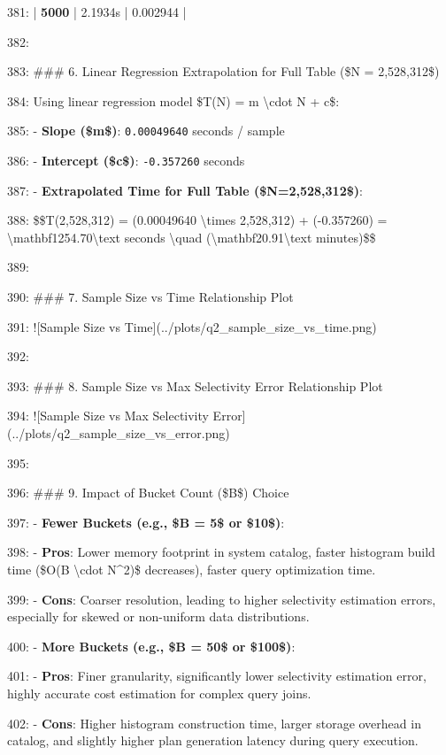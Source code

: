 \documentclass[11pt,a4paper]{article}
\begin{document}
{381: | \textbf{5000} | 2.1934s | 0.002944 |

382:

383: \#\#\# 6. Linear Regression Extrapolation for Full Table (\$N = 2,528,312\$)

384: Using linear regression model \$T(N) = m \textbackslash{}cdot N + c\$:

385: - \textbf{Slope (\$m\$)}: \texttt{0.00049640} seconds / sample

386: - \textbf{Intercept (\$c\$)}: \texttt{-0.357260} seconds

387: - \textbf{Extrapolated Time for Full Table (\$N=2,528,312\$)}:

388:   \$\$T(2,528,312) = (0.00049640 \textbackslash{}times 2,528,312) + (-0.357260) = \textbackslash{}mathbf{1254.70\textbackslash{}text{ seconds}} \textbackslash{}quad (\textbackslash{}mathbf{20.91\textbackslash{}text{ minutes}})\$\$

389:

390: \#\#\# 7. Sample Size vs Time Relationship Plot

391: ![Sample Size vs Time](../plots/q2\_sample\_size\_vs\_time.png)

392:

393: \#\#\# 8. Sample Size vs Max Selectivity Error Relationship Plot

394: ![Sample Size vs Max Selectivity Error](../plots/q2\_sample\_size\_vs\_error.png)

395:

396: \#\#\# 9. Impact of Bucket Count (\$B\$) Choice

397: - \textbf{Fewer Buckets (e.g., \$B = 5\$ or \$10\$)}:

398:   - \textbf{Pros}: Lower memory footprint in system catalog, faster histogram build time (\$O(B \textbackslash{}cdot N\textasciicircum{}2)\$ decreases), faster query optimization time.

399:   - \textbf{Cons}: Coarser resolution, leading to higher selectivity estimation errors, especially for skewed or non-uniform data distributions.

400: - \textbf{More Buckets (e.g., \$B = 50\$ or \$100\$)}:

401:   - \textbf{Pros}: Finer granularity, significantly lower selectivity estimation error, highly accurate cost estimation for complex query joins.

402:   - \textbf{Cons}: Higher histogram construction time, larger storage overhead in catalog, and slightly higher plan generation latency during query execution.

}
\end{document}
